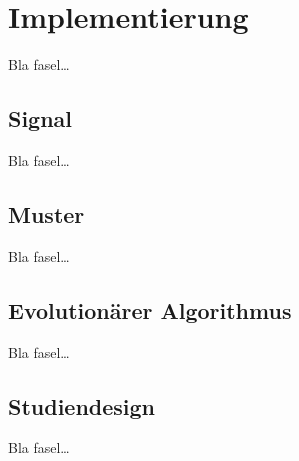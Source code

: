 
\chapter{Implementierung}
\label{ch:Implementierung}
Bla fasel\ldots

\section{Signal}
\label{ch:Implementierung:sec:Signal}

Bla fasel\ldots



\section{Muster}
\label{ch:Implementierung:sec:Muster}

Bla fasel\ldots




\section{Evolutionärer Algorithmus}
\label{ch:Implementierung:sec:Evolutionärer Algorithmus}

Bla fasel\ldots



\section{Studiendesign}
\label{ch:Implementierung:sec:Studiendesign}

Bla fasel\ldots



